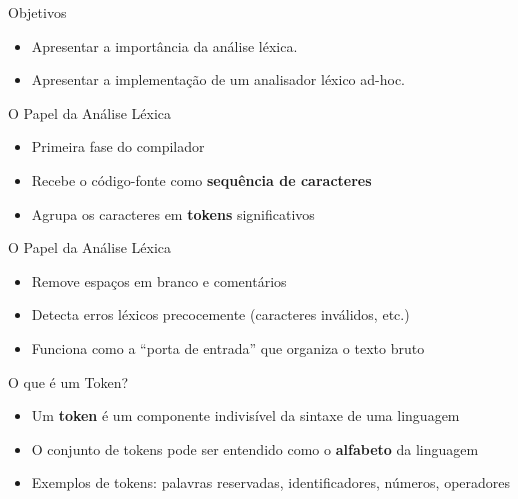 \subtitle{\bf Aula 2 - Análise Léxica}
\begin{frame}[t,plain]
    \titlepage
\end{frame}

\begin{frame}{Objetivos}

    \begin{itemize}
        \item
        Apresentar a importância da análise léxica.
        \item
        Apresentar a implementação de um analisador léxico ad-hoc.
    \end{itemize}
\end{frame}



\begin{frame}{O Papel da Análise Léxica}

    \begin{itemize}

        \item
        Primeira fase do compilador
        \item
        Recebe o código-fonte como \textbf{sequência de caracteres}
        \item
        Agrupa os caracteres em \textbf{tokens} significativos
    \end{itemize}
\end{frame}

\begin{frame}{O Papel da Análise Léxica}

    \begin{itemize}

        \item
        Remove espaços em branco e comentários
        \item
        Detecta erros léxicos precocemente (caracteres inválidos, etc.)
        \item
        Funciona como a ``porta de entrada'' que organiza o texto bruto
    \end{itemize}
\end{frame}

\begin{frame}{O que é um Token?}

    \begin{itemize}

        \item
        Um \textbf{token} é um componente indivisível da sintaxe de uma
        linguagem
        \item
        O conjunto de tokens pode ser entendido como o \textbf{alfabeto} da
        linguagem
        \item
        Exemplos de tokens: palavras reservadas, identificadores, números,
        operadores
    \end{itemize}
\end{frame}


